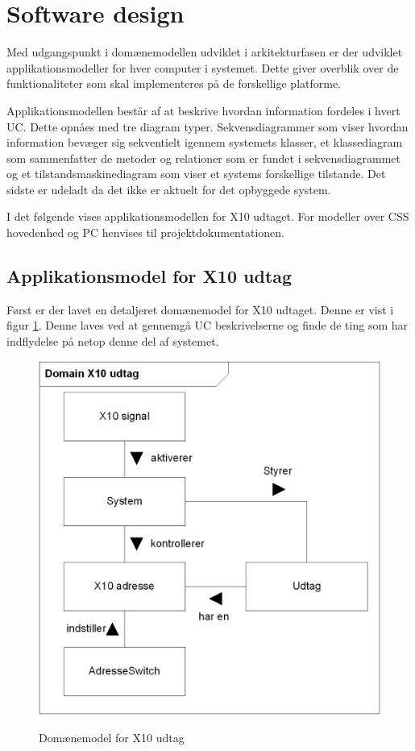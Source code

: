 \section{Software design}

Med udgangspunkt i domænemodellen udviklet i arkitekturfasen er der udviklet applikationsmodeller for hver computer i systemet. Dette giver overblik over de funktionaliteter som skal implementeres på de forskellige platforme.

Applikationsmodellen består af at beskrive hvordan information fordeles i hvert UC. Dette opnåes med tre diagram typer. Sekvensdiagrammer som viser hvordan information bevæger sig sekventielt igennem systemets klasser, et klassediagram som sammenfatter de metoder og relationer som er fundet i sekvensdiagrammet og et tilstandsmaskinediagram som viser et systems forskellige tilstande. Det sidste er udeladt da det ikke er aktuelt for det opbyggede system.

I det følgende vises applikationsmodellen for X10 udtaget. For modeller over CSS hovedenhed og PC henvises til projektdokumentationen.

\subsection{Applikationsmodel for X10 udtag}
Først er der lavet en detaljeret domænemodel for X10 udtaget. Denne er vist i figur \ref{fig:X10_udtag_domaenemodel}. Denne laves ved at gennemgå UC beskrivelserne og finde de ting som har indflydelse på netop denne del af systemet.

\begin{figure}[!htb]
     \centering
     { \includegraphics{Billeder/UML/X10_modtager_Domain}}
     \caption{Domænemodel for X10 udtag}
     \label{fig:X10_udtag_domaenemodel}
\end{figure}

